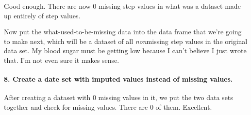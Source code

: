 \documentclass[]{article}
\newenvironment{Shaded}{\begin{snugshade}}{\end{snugshade}}
\newcommand{\KeywordTok}[1]{\textcolor[rgb]{0.13,0.29,0.53}{\textbf{#1}}}
\newcommand{\DataTypeTok}[1]{\textcolor[rgb]{0.13,0.29,0.53}{#1}}
\newcommand{\StringTok}[1]{\textcolor[rgb]{0.31,0.60,0.02}{#1}}
\newcommand{\CommentTok}[1]{\textcolor[rgb]{0.56,0.35,0.01}{\textit{#1}}}
\newcommand{\OtherTok}[1]{\textcolor[rgb]{0.56,0.35,0.01}{#1}}
\newcommand{\OperatorTok}[1]{\textcolor[rgb]{0.81,0.36,0.00}{\textbf{#1}}}
\newcommand{\NormalTok}[1]{#1}
\let\oldparagraph\paragraph
\renewcommand{\paragraph}[1]{\oldparagraph{#1}\mbox{}}
\begin{document}
\begin{Shaded}
\end{Shaded}

Good enough. There are now 0 missing step values in what was a dataset
made up entirely of step values.

Now put the what-used-to-be-missing data into the data frame that we're
going to make next, which will be a dataset of all \emph{non}missing
step values in the original data set. My blood sugar must be getting low
because I can't believe I just wrote that. I'm not even sure it makes
sense.

\paragraph{8. Create a date set with imputed values instead of missing
values.}\label{create-a-date-set-with-imputed-values-instead-of-missing-values.}

\begin{Shaded}
\end{Shaded}

After creating a dataset with 0 missing values in it, we put the two
data sets together and check for missing values. There are 0 of them.
Excellent.
\end{document}
